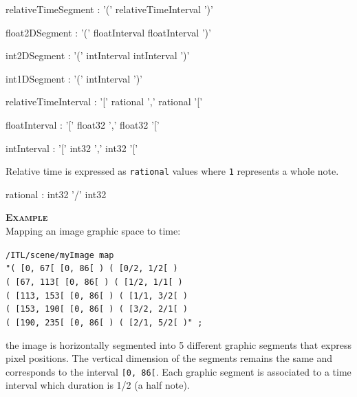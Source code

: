 \documentclass[a4paper,twoside]{report}
\newcommand{\OSC}[1]		{\texttt{#1}}
\newcommand{\values}[1]		{\texttt{#1}}
\newcommand{\example}		{\textbf{\hspace{-1.5cm}\textbf{\textsc{Example }}}}
\newcommand{\sample}	[1]			{\vspace{-2mm}\begin{center}\colorbox{mygrey}{
								\begin{minipage}[t]{0.9\columnwidth} 
								{\small \texttt{#1}}
								\end{minipage}}\end{center}}
\begin{document}
\begin{rail}
relativeTimeSegment : '(' relativeTimeInterval ')' 
\end{rail}
\begin{rail}
float2DSegment : '(' floatInterval floatInterval ')' 
\end{rail}
\begin{rail}
int2DSegment : '(' intInterval intInterval ')' 
\end{rail}
\begin{rail}
int1DSegment : '(' intInterval ')' 
\end{rail}


\begin{rail}
relativeTimeInterval : '[' rational ',' rational '[' 
\end{rail}
\begin{rail}
floatInterval : '[' float32 ',' float32 '['
\end{rail}
\begin{rail}
intInterval : '[' int32 ',' int32 '['
\end{rail}

Relative time is expressed as \OSC{rational} values where \values{1} represents a whole note.

\begin{rail}
rational : int32 '/' int32
\end{rail}

\example \\
Mapping an image graphic space to time:
\sample{/ITL/scene/myImage map \\
\hspace*{1cm}"( [0, 67[    [0, 86[ ) ( [0/2, 1/2[ ) \\
\hspace*{1.15cm}( [67, 113[  [0, 86[ ) ( [1/2, 1/1[ ) \\
\hspace*{1.15cm}( [113, 153[ [0, 86[ ) ( [1/1, 3/2[ ) \\
\hspace*{1.15cm}( [153, 190[ [0, 86[ ) ( [3/2, 2/1[ ) \\
\hspace*{1.15cm}( [190, 235[ [0, 86[ ) ( [2/1, 5/2[ )" ;
}
the image is horizontally segmented into 5 different graphic segments that express pixel positions. The vertical dimension of the segments remains the same and corresponds to the interval \values{[0, 86[}. Each graphic segment is associated to a time interval which duration is 1/2 (a half note).
\end{document}
